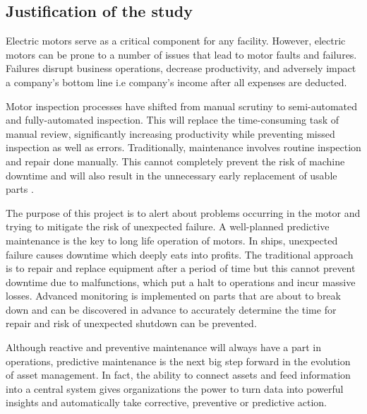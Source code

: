 \subsection{Justification of the study}
Electric motors serve as a critical component for any facility. However, electric motors can be prone to a number of issues that lead to motor faults and failures. Failures disrupt business operations, decrease productivity, and adversely impact a company’s bottom line i.e company's income after all expenses are deducted. 

Motor inspection processes have shifted from manual scrutiny to semi-automated and fully-automated inspection. This will replace the time-consuming task of manual review, significantly increasing productivity while preventing missed inspection as well as errors. Traditionally, maintenance involves routine inspection and repair done manually. This cannot completely prevent the risk of machine downtime and will also result in the unnecessary early replacement of usable parts \cite{sampaio_prediction_2019}.  


The purpose of this project is to alert about problems occurring in the motor and trying to mitigate the risk of unexpected failure. A well-planned predictive maintenance is the key to long life operation of motors. In ships, unexpected failure causes downtime which deeply eats into profits. The traditional approach is to repair and replace equipment after a period of time but this cannot prevent downtime due to malfunctions, which put a halt to operations and incur massive losses. Advanced monitoring is implemented on parts that are about to break down and can be discovered in advance to accurately determine the time for repair and risk of unexpected shutdown can be prevented. \cite{sampaio_prediction_2019}

Although reactive and preventive maintenance will always have a part in operations, predictive maintenance is the next big step forward in the evolution of asset management. In fact, the ability to connect assets and feed information into a central system gives organizations the power to turn data into powerful insights and automatically take corrective, preventive or predictive action.
